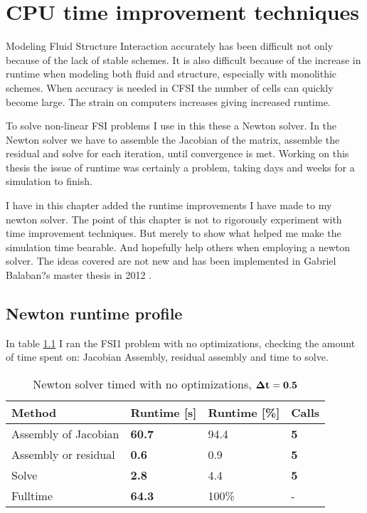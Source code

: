 \chapter{CPU time improvement techniques}\label{runtime}
Modeling Fluid Structure Interaction accurately has been difficult not only because of the lack of stable schemes. It is also difficult because of the increase in runtime when modeling both fluid and structure, especially with monolithic schemes. When accuracy is needed in CFSI the number of cells can quickly become large. The strain on computers increases giving increased runtime. 

To solve non-linear FSI problems I use in this these a Newton solver. In the Newton solver we have to assemble the Jacobian of the matrix, assemble the residual and solve for each iteration, until convergence is met. Working on this thesis the issue of runtime was certainly a problem, taking days and weeks for a simulation to finish. 

I have in this chapter added the runtime improvements I have made to my newton solver. The point of this chapter is not to rigorously experiment with time improvement techniques. But merely to show what helped me make the simulation time bearable. And hopefully help others when employing a newton solver. The ideas covered are not new and has been implemented in Gabriel Balaban?s master thesis in 2012 \cite{Sciences2012}.

\section{Newton runtime profile}
In table \ref{no_opt} I ran the FSI1 problem with no optimizations, checking the amount of time spent on: Jacobian Assembly, residual assembly and time to solve. 

\begin{table}[H]
\centering
\caption{Newton solver timed with no optimizations, $\bold{\Delta t = 0.5}$ }
\label{no_opt}
\begin{tabular}{|l|l|l|l|}
\hline
Method               & \textbf{Runtime {{[}}s{{]}}} & Runtime {{[}}\%{{]}} & \textbf{Calls} \\ \hline
Assembly of Jacobian & \textbf{60.7}                    & 94.4                     & \textbf{5}     \\ \hline
Assembly or residual & \textbf{0.6}                     & 0.9                      & \textbf{5}     \\ \hline
Solve                & \textbf{2.8}                     & 4.4                      & \textbf{5}     \\ \hline
Fulltime             & \textbf{64.3}                    & 100\%                    & -                \\ \hline
\end{tabular}
\end{table}

